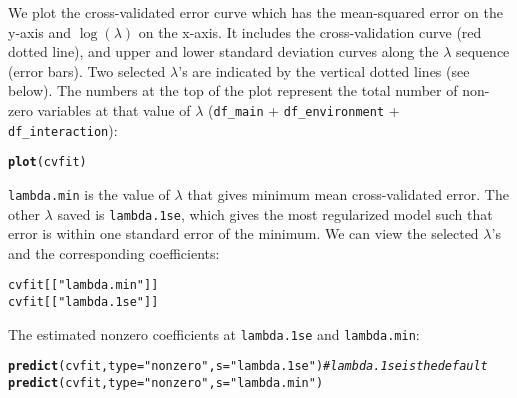 \documentclass[12pt,letter]{article}\usepackage[]{graphicx}\usepackage[]{color}
\makeatletter
\newcommand{\hlstr}[1]{\textcolor[rgb]{0.192,0.494,0.8}{#1}}%
\newcommand{\hlcom}[1]{\textcolor[rgb]{0.678,0.584,0.686}{\textit{#1}}}%
\newcommand{\hlstd}[1]{\textcolor[rgb]{0.345,0.345,0.345}{#1}}%
\newcommand{\hlkwc}[1]{\textcolor[rgb]{0.333,0.667,0.333}{#1}}%
\newcommand{\hlkwd}[1]{\textcolor[rgb]{0.737,0.353,0.396}{\textbf{#1}}}%
\newenvironment{kframe}{%
 \def\at@end@of@kframe{}%
 \ifinner\ifhmode%
  \def\at@end@of@kframe{\end{minipage}}%
  \begin{minipage}{\columnwidth}%
 \fi\fi%
 \def\FrameCommand##1{\hskip\@totalleftmargin \hskip-\fboxsep
 \colorbox{shadecolor}{##1}\hskip-\fboxsep
     \hskip-\linewidth \hskip-\@totalleftmargin \hskip\columnwidth}%
 \MakeFramed {\advance\hsize-\width
   \@totalleftmargin\z@ \linewidth\hsize
   \@setminipage}}%
 {\par\unskip\endMakeFramed%
 \at@end@of@kframe}
\newenvironment{knitrout}{}{} %
\makeatother
\begin{document}
We plot the cross-validated error curve which has the mean-squared error on the y-axis and $\log(\lambda)$ on the x-axis. It includes the cross-validation curve (red dotted line), and upper and lower standard deviation curves along the $\lambda$ sequence (error bars). Two selected $\lambda$'s are indicated by the vertical dotted lines (see below). The numbers at the top of the plot represent the total number of non-zero variables at that value of $\lambda$ (\texttt{df\_main} + \texttt{df\_environment} + \texttt{df\_interaction}):


\begin{knitrout}\scriptsize
{}\color{fgcolor}\begin{kframe}
\begin{alltt}
\hlkwd{plot}\hlstd{(cvfit)}
\end{alltt}
\end{kframe}
\end{knitrout}

\texttt{lambda.min} is the value of $\lambda$ that gives minimum mean cross-validated error. The other $\lambda$ saved is \texttt{lambda.1se},
which gives the most regularized model such that error is within one standard error of the minimum. We can view the selected $\lambda$'s and the corresponding coefficients:

\begin{knitrout}\scriptsize
{}\color{fgcolor}\begin{kframe}
\begin{alltt}
\hlstd{cvfit[[}\hlstr{"lambda.min"}\hlstd{]]}
\hlstd{cvfit[[}\hlstr{"lambda.1se"}\hlstd{]]}
\end{alltt}
\end{kframe}
\end{knitrout}

The estimated nonzero coefficients at \texttt{lambda.1se} and \texttt{lambda.min}:

\begin{knitrout}\scriptsize
{}\color{fgcolor}\begin{kframe}
\begin{alltt}
\hlkwd{predict}\hlstd{(cvfit,} \hlkwc{type} \hlstd{=} \hlstr{"nonzero"}\hlstd{,} \hlkwc{s}\hlstd{=}\hlstr{"lambda.1se"}\hlstd{)} \hlcom{# lambda.1se is the default}
\hlkwd{predict}\hlstd{(cvfit,} \hlkwc{type} \hlstd{=} \hlstr{"nonzero"}\hlstd{,} \hlkwc{s} \hlstd{=} \hlstr{"lambda.min"}\hlstd{)}
\end{alltt}
\end{kframe}
\end{knitrout}
\end{document}
